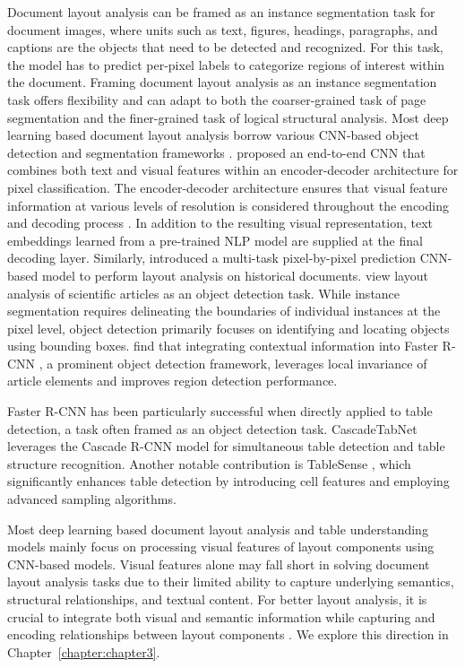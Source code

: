 Document layout analysis can be framed as an instance segmentation task for document images, where units such as text, figures, headings, paragraphs, and captions are the objects that need to be detected and recognized. For this task, the model has to predict per-pixel labels to categorize regions of interest within the document. Framing document layout analysis as an instance segmentation task offers flexibility and can adapt to both the coarser-grained task of page segmentation and the finer-grained task of logical structural analysis. Most deep learning based document layout analysis borrow various \ac{CNN}-based object detection and segmentation frameworks \citet{ren2015faster, cai2018cascade}. \citet{yang2017learning} proposed an end-to-end \ac{CNN} that combines both text and visual features within an encoder-decoder architecture for pixel classification. The encoder-decoder architecture ensures that visual feature information at various levels of resolution is considered throughout the encoding and decoding process \citep{burt1987laplacian}. In addition to the resulting visual representation, text embeddings learned from a pre-trained \ac{NLP} model are supplied at the final decoding layer. Similarly, \citet{oliveira2018dhsegment} introduced a multi-task pixel-by-pixel prediction \ac{CNN}-based model to perform layout analysis on historical documents. \citet{soto2019visual} view layout analysis of scientific articles as an object detection task. While instance segmentation requires delineating the boundaries of individual instances at the pixel level, object detection primarily focuses on identifying and locating objects using bounding boxes. \citet{soto2019visual} find that integrating contextual information into Faster R-CNN \citep{ren2015faster}, a prominent object detection framework, leverages local invariance of article elements and improves region detection performance. 

Faster R-CNN has been particularly successful when directly applied to table detection, a task often framed as an object detection task. CascadeTabNet \citep{prasad2020cascadetabnet} leverages the Cascade R-CNN \citep{cai2018cascade} model for simultaneous table detection and table structure recognition. Another notable contribution is TableSense \citep{dong2019tablesense}, which significantly enhances table detection by introducing cell features and employing advanced sampling algorithms. 

Most deep learning based document layout analysis and table understanding models mainly focus on processing visual features of layout components using \ac{CNN}-based models. Visual features alone may fall short in solving document layout analysis tasks due to their limited ability to capture underlying semantics, structural relationships, and textual content. For better layout analysis, it is crucial to integrate both visual and semantic information while capturing and encoding relationships between layout components \citep{luo2022doc}. We explore this direction in Chapter~\ref{chapter:chapter3}.


